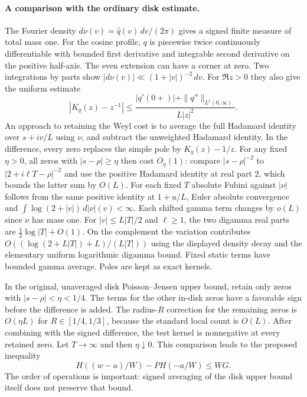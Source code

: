 \paragraph{A comparison with the ordinary disk estimate.}
The Fourier density $d\nu(v)=\widehat q(v)\,dv/(2\pi)$ gives a signed
finite measure of total mass one. For the cosine profile, $q$ is
piecewise twice continuously differentiable with bounded first derivative
and integrable second derivative on the positive half-axis. The even
extension can have a corner at zero. Two integrations by parts show
$|d\nu(v)|\ll(1+|v|)^{-2}\,dv$. For $\Re z>0$ they also give the
uniform estimate
\[
              |K_q(z)-z^{-1}|\le
       \frac{|q'(0+)|+\|q''\|_{L^1(0,\infty)}}{L|z|^2}.
\]
An approach to retaining the Weyl cost is to average the full Hadamard
identity over $s+iv/L$ using $\nu$, and subtract the unweighted
Hadamard identity. In the difference, every zero replaces the simple
pole by $K_q(z)-1/z$. For any fixed $\eta>0$, all zeros with
$|s-\rho|\ge\eta$ then cost $O_{\eta}(1)$: compare
$|s-\rho|^{-2}$ to $|2+i\ell T-\rho|^{-2}$ and use the positive
Hadamard identity at real part $2$, which bounds the latter sum by
$O(L)$. For each fixed $T$ absolute Fubini against $|\nu|$ follows
from the same positive identity at $1+u/L$, Euler absolute convergence
and $\int \log(2+|v|)\,d|\nu|(v)<\infty$.
Each shifted gamma term changes by $o(L)$ since $\nu$ has mass one.
For $|v|\le L|T|/2$ and $\ell\ge1$, the two digamma real parts
are $\tfrac12\log|T|+O(1)$. On the complement the variation contributes
$O((\log(2+L|T|)+L)/(L|T|))$ using the displayed density decay and
the elementary uniform logarithmic digamma bound. Fixed static terms
have bounded gamma average. Poles are kept as exact kernels.

In the original, unaveraged disk Poisson--Jensen upper bound, retain
only zeros with $|s-\rho|<\eta<1/4$. The terms for the other
in-disk zeros have a favorable sign before the difference is added.
The radius-$R$ correction for the remaining zeros is
$O(\eta L)$ for $R\in[1/4,1/3]$, because the standard local count is
$O(L)$. After combining with the signed difference, the test kernel
is nonnegative at every retained zero. Let $T\to\infty$ and then
$\eta\downarrow0$. This comparison leads to the proposed inequality
\[
           H((w-a)/W)-P H(-a/W)\le WG .
\]
The order of operations is important: signed averaging of the disk
upper bound itself does not preserve that bound.

